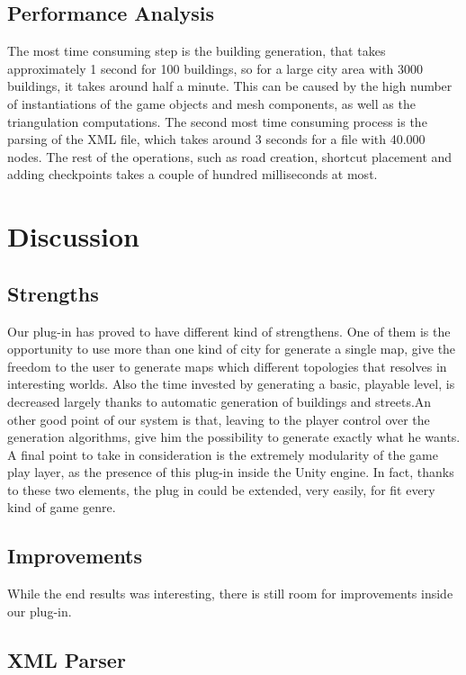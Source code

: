 \documentclass[conference]{IEEEtran}
\begin{document}
\subsection{Performance Analysis}

The most time consuming step is the building generation, that takes approximately 1 second for 100 buildings, so for a large city area with 3000 buildings, it takes around half a minute. This can be caused by the high number of instantiations of the game objects and mesh components, as well as the triangulation computations. The second most time consuming process is the parsing of the XML file, which takes around 3 seconds for a file with 40.000 nodes. The rest of the operations, such as road creation, shortcut placement and adding checkpoints takes a couple of hundred milliseconds at most.

\section{Discussion}

\subsection{Strengths}

Our plug-in has proved to have different kind of strengthens. One of them is the opportunity to use more than one kind of city for generate a single map, give the freedom to the user to generate maps which different topologies that resolves in interesting worlds. Also the time invested by generating a basic, playable level, is decreased largely thanks to automatic generation of buildings and streets.An other good point of our system is that, leaving to the player control over the generation algorithms, give him the possibility to generate exactly what he wants. A final point to take in consideration is the extremely modularity of the game play layer, as the presence of this plug-in inside the Unity engine. In fact, thanks to these two elements, the plug in could be extended, very easily, for fit every kind of game genre. 

\subsection{Improvements}

While the end results was interesting, there is still room for improvements inside our plug-in.

\subsection{XML Parser}
\end{document}
